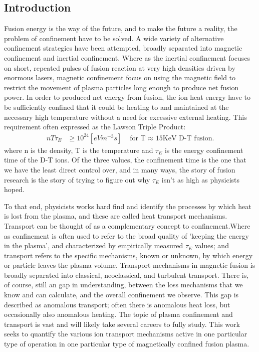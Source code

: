 \begin{refsection}

\chapter{Introduction}

Fusion energy is the way of the future, and to make the future a reality, the problem of confinement have to be solved. 
A wide variety of alternative confinement
strategies have been attempted, broadly separated into magnetic confinement and
inertial confinement. Where as the inertial confinement focuses on short,
repeated pulses of fusion reaction at very high densities driven by enormous
lasers, magnetic confinement focus on using the magnetic field to restrict the
movement of plasma particles long enough to produce net fusion power. In order to produced net energy from fusion, the ion heat energy have to be sufficiently confined that it could be heating to and maintained at the necessary high temperature without a need for excessive external heating. This requirement often expressed as the Lawson Triple Product:
\begin{align}
    nT\tau_{E} &\geq 10^{24} [eV m^{-3}s] &\text{  for T $\approx$ 15KeV D-T fusion.}
\end{align}
where n is the density, T is the temperature and $\tau_{E}$ is the energy confinement time of the D-T ions. Of the three values, the confinement time is the one that we have the least direct control over, and in many ways, the story of fusion research is the story of trying to figure out why $\tau_{E}$ isn't as high as physicists hoped. 

To that end, physicists works hard find and identify the processes by which heat is lost from the plasma, and these are called heat transport mechanisms. Transport can be thought of as a complementary concept to confinement.Where as confinement is often used to refer to the broad quality of 'keeping the energy in the plasma', and characterized by empirically measured $\tau_{E}$ values; and transport refers to the specific mechanisms, known or unknown, by which energy or particle leaves the plasma volume. Transport mechanisms in magnetic fusion is broadly separated into classical, neoclassical, and turbulent transport. There is, of course, still an gap in understanding, between the loss mechanisms that we know and can calculate, and the overall confinement we observe. This gap is described as anomalous transport; often there is anomalous heat loss, but occasionally also anomalous heating. The topic of plasma confinement and transport is vast and will likely take several careers to fully study. This work seeks to quantify the various ion transport mechanisms active in one particular type of operation in one particular type of magnetically confined fusion plasma.


\end{refsection}
